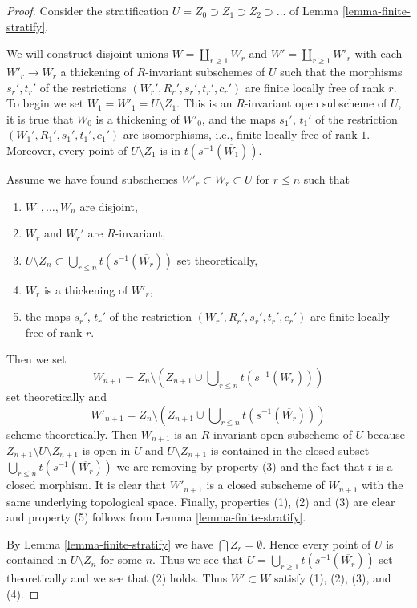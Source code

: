\begin{proof}
Consider the stratification $U = Z_0 \supset Z_1 \supset Z_2 \supset \ldots$
of Lemma \ref{lemma-finite-stratify}.

\medskip\noindent
We will construct disjoint unions $W = \coprod_{r \geq 1} W_r$ and
$W' = \coprod_{r \geq 1} W'_r$ with each $W'_r \to W_r$ a thickening
of $R$-invariant subschemes of $U$ such that the morphisms
$s_r', t_r'$ of the restrictions $(W_r', R_r', s_r', t_r', c_r')$
are finite locally free of rank $r$. To begin we set
$W_1 = W'_1 = U \setminus Z_1$. This is an $R$-invariant open
subscheme of $U$, it is true that $W_0$ is a thickening of $W'_0$,
and the maps $s_1'$, $t_1'$ of the
restriction $(W_1', R_1', s_1', t_1', c_1')$ are isomorphisms, i.e.,
finite locally free of rank $1$.
Moreover, every point of $U \setminus Z_1$ is in $t(s^{-1}(\overline{W_1}))$.

\medskip\noindent
Assume we have found subschemes $W'_r \subset W_r \subset U$ for $r \leq n$
such that
\begin{enumerate}
\item $W_1, \ldots, W_n$ are disjoint,
\item $W_r$ and $W_r'$ are $R$-invariant,
\item $U \setminus Z_n \subset \bigcup_{r \leq n} t(s^{-1}(\overline{W_r}))$
set theoretically,
\item $W_r$ is a thickening of $W'_r$,
\item the maps $s_r'$, $t_r'$ of the restriction
$(W_r', R_r', s_r', t_r', c_r')$ are finite locally free of rank $r$.
\end{enumerate}
Then we set
$$
W_{n + 1} = Z_n \setminus
\left(
Z_{n + 1} \cup \bigcup\nolimits_{r \leq n} t(s^{-1}(\overline{W_r}))
\right)
$$
set theoretically and
$$
W'_{n + 1} = Z_n \setminus
\left(
Z_{n + 1} \cup \bigcup\nolimits_{r \leq n} t(s^{-1}(\overline{W_r}))
\right)
$$
scheme theoretically. Then $W_{n + 1}$ is an $R$-invariant open subscheme
of $U$ because $Z_{n + 1} \setminus \overline{U \setminus Z_{n + 1}}$
is open in $U$ and $\overline{U \setminus Z_{n + 1}}$ is contained
in the closed subset $\bigcup\nolimits_{r \leq n} t(s^{-1}(\overline{W_r}))$
we are removing by property (3) and the fact that $t$ is a closed morphism.
It is clear that $W'_{n + 1}$ is a closed subscheme
of $W_{n + 1}$ with the same underlying topological space.
Finally, properties (1), (2) and (3) are clear and property (5) follows from
Lemma \ref{lemma-finite-stratify}.

\medskip\noindent
By Lemma \ref{lemma-finite-stratify} we have $\bigcap Z_r = \emptyset$.
Hence every point of $U$ is contained in $U \setminus Z_n$
for some $n$. Thus we see that
$U = \bigcup_{r \geq 1} t(s^{-1}(\overline{W_r}))$
set theoretically and we see that (2) holds.
Thus $W' \subset W$ satisfy (1), (2), (3), and (4).
\end{proof}

